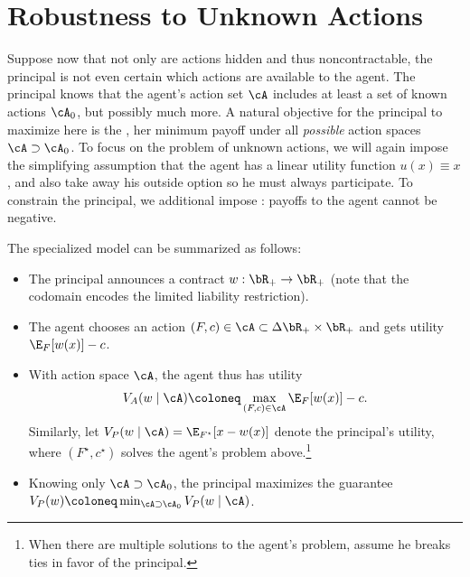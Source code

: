 \section{Robustness to Unknown Actions}
Suppose now that not only are actions hidden and thus noncontractable, the principal is not even certain which actions are available to the agent.
The principal knows that the agent's action set \(\cA\) includes at least a set of known actions \(\cA_0\), but possibly much more.
A natural objective for the principal to maximize here is the , her minimum payoff under all \emph{possible} action spaces \(\cA \supset \cA_0\).
To focus on the problem of unknown actions, we will again impose the simplifying assumption that the agent has a linear utility function \(u(x) \equiv x\), and also take away his outside option so he must always participate.
To constrain the principal, we additional impose : payoffs to the agent cannot be negative.

The specialized model can be summarized as follows:
\begin{itemize}
  \item The principal announces a contract \(w : \bR_+ \to \bR_+\) (note that the codomain encodes the limited liability restriction).
  \item The agent chooses an action \((F, c) \in \cA \subset \Delta \bR_+ \times \bR_+\) and gets utility \(\E_F[w(x)] - c\).
  \item With action space \(\cA\), the agent thus has utility
    \[
      V_A(w \mid \cA) \coloneq \max_{(F, c) \in \cA} \E_F[w(x)] - c.
    \]
    Similarly, let \(V_P(w \mid \cA) = \E_{F^\star}[x - w(x)]\) denote the principal's utility, where \((F^\star, c^\star)\) solves the agent's problem above.\footnote{When there are multiple solutions to the agent's problem, assume he breaks ties in favor of the principal.}
  \item Knowing only \(\cA \supset \cA_0\), the principal maximizes the guarantee \(V_P(w) \coloneq \min_{\cA \supset \cA_0} V_P(w \mid \cA)\).
\end{itemize}


